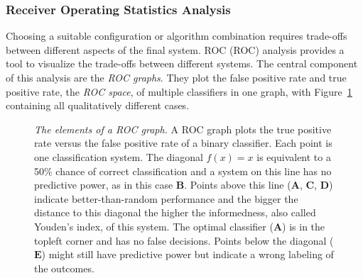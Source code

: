 \subsubsection*{Receiver Operating Statistics Analysis}

Choosing a suitable configuration or algorithm combination requires trade-offs between different aspects of the final system.
\acrlong{ROC} (\acrshort{ROC}) analysis\cite{fawcett_2006} provides a tool to visualize the trade-offs between different systems.
The central component of this analysis are the \emph{\acrshort{ROC} graphs}.
They plot the false positive rate and true positive rate, the \emph{\acrshort{ROC} space}, of multiple classifiers in one graph, with Figure~\ref{fig:roc_graph} containing all qualitatively different cases.
\begin{figure}[H]
\caption[The elements of a \acrshort{ROC} graph]{\emph{The elements of a \acrshort{ROC} graph.} A \acrshort{ROC} graph plots the true positive rate versus the false positive rate of a binary classifier. Each point is one classification system. The diagonal $f(x) = x$ is equivalent to a 50\% chance of correct classification and a system on this line has no predictive power, as in this case $\mathbf{B}$. Points above this line ($\mathbf{A}$, $\mathbf{C}$, $\mathbf{D}$) indicate better-than-random performance and the bigger the distance to this diagonal the higher the informedness, also called Youden's index, of this system. The optimal classifier ($\mathbf{A}$) is in the topleft corner and has no false decisions. Points below the diagonal ($\mathbf{E}$) might still have predictive power but indicate a wrong labeling of the outcomes.}\label{fig:roc_graph}
\end{figure}

